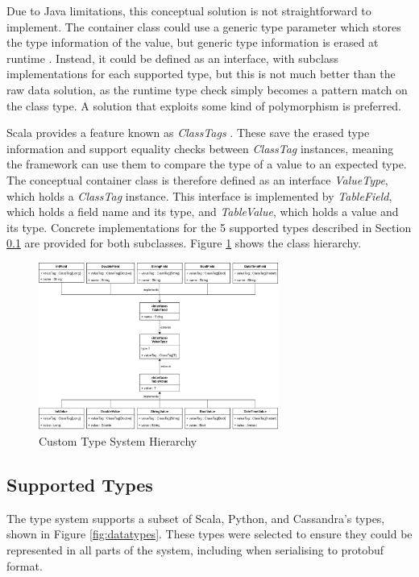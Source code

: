 Due to Java limitations, this conceptual solution is not straightforward to implement. The container class could use a generic type parameter which stores the type information of the value, but generic type information is erased at runtime \cite{ghosh2004generics}. Instead, it could be defined as an interface, with subclass implementations for each supported type, but this is not much better than the raw data solution, as the runtime type check simply becomes a pattern match on the class type. A solution that exploits some kind of polymorphism is preferred. 

Scala provides a feature known as \textit{ClassTags} \cite{scalaclasstags}. These save the erased type information and support equality checks between \textit{ClassTag} instances, meaning the framework can use them to compare the type of a value to an expected type. The conceptual container class is therefore defined as an interface \textit{ValueType}, which holds a \textit{ClassTag} instance. This interface is implemented by \textit{TableField}, which holds a field name and its type, and \textit{TableValue}, which holds a value and its type. Concrete implementations for the 5 supported types described in Section \ref{subsec:supported-types} are provided for both subclasses. Figure \ref{fig:type-system-hierarchy} shows the class hierarchy.

\begin{figure}[htp]
	\centering
	\includegraphics[width=0.7\textwidth]{chapters/diagrams/implementation/type-system-hierarchy}
	\caption{Custom Type System Hierarchy}
	\label{fig:type-system-hierarchy}
\end{figure}

\subsection{Supported Types}\label{subsec:supported-types}
The type system supports a subset of Scala, Python, and Cassandra's types, shown in Figure \ref{fig:datatypes}. These types were selected to ensure they could be represented in all parts of the system, including when serialising to protobuf format.

